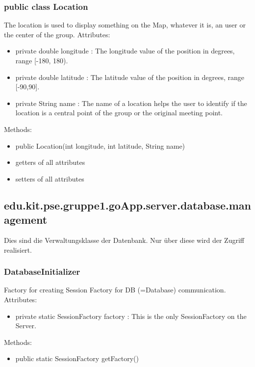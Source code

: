 	\subsubsection{public class Location}
	The location is used to display something on the Map, whatever it is, an user or the center of the group.
	\newline Attributes:
	\begin{itemize}
	\item private  double longitude : The longitude value of the position in degrees, range [-180, 180). 
	\item private  double latitude : The latitude value of the position in degrees, range [-90,90].
	\item private String name : The name of a location helps the user to identify if the location is a central point of the group or the original meeting point.
	\end{itemize}
	Methods:
	\begin{itemize}
	\item public Location(int longitude, int latitude, String name)
	\item getters of all attributes
	\item setters of all attributes
	\end{itemize}

\newpage
\hypertarget{database.management}{}
	\subsection{edu.kit.pse.gruppe1.goApp.server.database.management}	
	Dies sind die Verwaltungsklasse der Datenbank. Nur über diese wird der Zugriff realisiert.

	\subsubsection{DatabaseInitializer}
	Factory for creating Session Factory for DB (=Database) communication.
	\newline 
	Attributes:
	\begin{itemize}
		\item private static SessionFactory factory : This is the only SessionFactory on the Server.
	\end{itemize}
	Methods:
	\begin{itemize}
		\item public static SessionFactory getFactory()
	\end{itemize}
	
